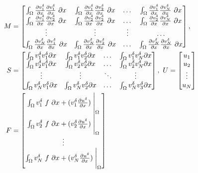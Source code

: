 \begin{align}
M &=
\begin{bmatrix}
\int_\Omega \frac{\partial v^\delta_{1}}{\partial x}\frac{\partial v^\delta_{1}}{\partial x}\ \partial x  & \int_\Omega \frac{\partial v^\delta_{1}}{\partial x}\frac{\partial v^\delta_{2}}{\partial x}\ \partial x  & \dots & \int_\Omega \frac{\partial v^\delta_{1}}{\partial x}\frac{\partial v^\delta_{N}}{\partial x}\ \partial x  \\ 
\int_\Omega \frac{\partial v^\delta_{1}}{\partial x}\frac{\partial v^\delta_{2}}{\partial x}\ \partial x  & \int_\Omega \frac{\partial v^\delta_{2}}{\partial x}\frac{\partial v^\delta_{2}}{\partial x}\ \partial x  & \dots & \int_\Omega \frac{\partial v^\delta_{2}}{\partial x}\frac{\partial v^\delta_{N}}{\partial x}\ \partial x  \\ 
\vdots & \vdots & \vdots & \dots \\
\int_\Omega \frac{\partial v^\delta_{N}}{\partial x}\frac{\partial v^\delta_{1}}{\partial x}\ \partial x  & \int_\Omega \frac{\partial v^\delta_{N}}{\partial x}\frac{\partial v^\delta_{2}}{\partial x}\ \partial x  & \dots & \int_\Omega \frac{\partial v^\delta_{N}}{\partial x}\frac{\partial v^\delta_{N}}{\partial x}\ \partial x  \\ 
\end{bmatrix}, \\
S &= \begin{bmatrix}
\int_\Omega v^\delta_1 v^\delta_1 \partial x & \int_\Omega v^\delta_1 v^\delta_2 \partial x & \dots & \int_\Omega v^\delta_1 v^\delta_N \partial x \\ 
\int_\Omega v^\delta_2 v^\delta_1 \partial x & \int_\Omega v^\delta_2 v^\delta_2 \partial x & \dots & \int_\Omega v^\delta_2 v^\delta_N \partial x\\ 
\vdots & \vdots & \ddots & \vdots \\
\int_\Omega v^\delta_N v^\delta_1 \partial x & \int_\Omega v^\delta_N v^\delta_2 \partial x & \dots & \int_\Omega v^\delta_N v^\delta_3 \partial x
\end{bmatrix},\
U = \begin{bmatrix}
u_1\\ 
u_2\\ 
\vdots \\
u_N
\end{bmatrix}\\
F &= \begin{bmatrix}
\int_\Omega v^\delta_1\ f\ \partial x +  (v^\delta_1  \frac{\partial u^\delta }{\partial x})\Biggm\lvert_\Omega \\ 
\int_\Omega v^\delta_2\ f\ \partial x +  (v^\delta_2  \frac{\partial u^\delta }{\partial x})\Biggm\lvert_\Omega \\ 
\vdots \\
\int_\Omega v^\delta_N\ f\ \partial x +  (v^\delta_N  \frac{\partial u^\delta }{\partial x})\Biggm\lvert_\Omega\\ 
\end{bmatrix}
\end{align}

